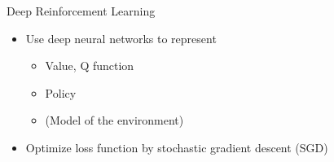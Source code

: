 \begin{frame}[c]{Deep Reinforcement Learning}

	\begin{itemize}
		\item Use deep neural networks to represent
		\begin{itemize}
			\item Value, Q function
			\item Policy
			\item (Model of the environment)
		\end{itemize}
		\item Optimize loss function by stochastic gradient descent (SGD)
	\end{itemize}
	
\end{frame}


